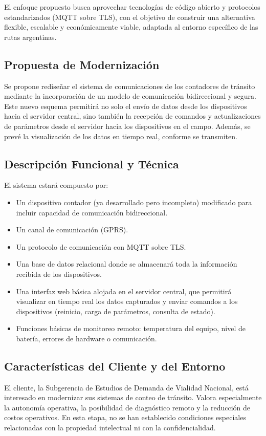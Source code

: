 \documentclass[
11pt, %
]{charter}
\begin{document}
El enfoque propuesto busca aprovechar tecnologías de código abierto y protocolos estandarizados (MQTT sobre TLS), con el objetivo de construir una alternativa flexible, escalable y económicamente viable, adaptada al entorno específico de las rutas argentinas.
\subsection{Propuesta de Modernización}

Se propone rediseñar el sistema de comunicaciones de los contadores de tránsito mediante la incorporación de un modelo de comunicación bidireccional y segura.
Este nuevo esquema permitirá no solo el envío de datos desde los dispositivos hacia el servidor central, sino también la recepción de comandos y actualizaciones de parámetros desde el servidor hacia los dispositivos en el campo.
Además, se prevé la visualización de los datos en tiempo real, conforme se transmiten.

\subsection{Descripción Funcional y Técnica}
El sistema estará compuesto por:
\begin{itemize}

\item Un dispositivo contador (ya desarrollado pero incompleto) modificado para incluir capacidad de comunicación bidireccional.

\item Un canal de comunicación (GPRS).

\item Un protocolo de comunicación con MQTT sobre TLS.

\item Una base de datos relacional donde se almacenará toda la información recibida de los dispositivos.

\item Una interfaz web básica alojada en el servidor central, que permitirá visualizar en tiempo real los datos capturados y enviar comandos a los dispositivos (reinicio, carga de parámetros, consulta de estado).

\item Funciones básicas de monitoreo remoto: temperatura del equipo, nivel de batería, errores de hardware o comunicación.

\end{itemize}

\subsection{Características del Cliente y del Entorno}
El cliente, la Subgerencia de Estudios de Demanda de Vialidad Nacional, está interesado en modernizar sus sistemas de conteo de tránsito. Valora especialmente la autonomía operativa, la posibilidad de diagnóstico remoto y la reducción de costos operativos.
En esta etapa, no se han establecido condiciones especiales relacionadas con la propiedad intelectual ni con la confidencialidad.
\end{document}
